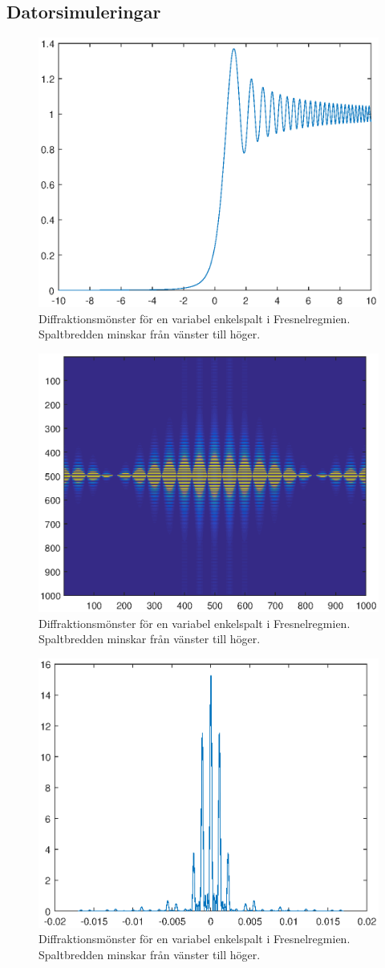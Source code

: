 \documentclass[a4paper]{article}
\begin{document}
\FloatBarrier

\subsection{Datorsimuleringar}

\FloatBarrier

\begin{figure}[h!]
	\centering
	\includegraphics[width=0.24\linewidth]{Data/Figurer/simuleringEgg.eps}
	\caption{Diffraktionsmönster för en variabel enkelspalt i Fresnelregmien. Spaltbredden minskar från vänster till höger.}
	\label{fig:fresnelEnkel}
\end{figure}

\FloatBarrier

\FloatBarrier

\begin{figure}[h!]
	\centering
	\includegraphics[width=0.24\linewidth]{Data/Figurer/simuleringDubbelspalt.eps}
	\caption{Diffraktionsmönster för en variabel enkelspalt i Fresnelregmien. Spaltbredden minskar från vänster till höger.}
	\label{fig:fresnelEnkel}
\end{figure}

\FloatBarrier

\FloatBarrier

\begin{figure}[h!]
	\centering
	\includegraphics[width=0.24\linewidth]{Data/Figurer/simulering4Spalt.eps}
	\caption{Diffraktionsmönster för en variabel enkelspalt i Fresnelregmien. Spaltbredden minskar från vänster till höger.}
	\label{fig:fresnelEnkel}
\end{figure}
\end{document}
